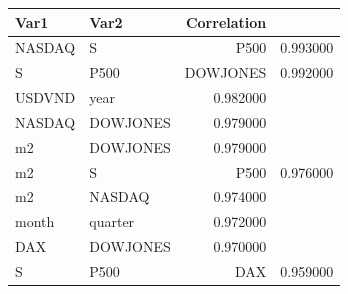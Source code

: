 \begin{tabular}{llr}
\toprule
Var1 & Var2 & Correlation \\
\midrule
NASDAQ & S&P500 & 0.993000 \\
S&P500 & DOWJONES & 0.992000 \\
USDVND & year & 0.982000 \\
NASDAQ & DOWJONES & 0.979000 \\
m2 & DOWJONES & 0.979000 \\
m2 & S&P500 & 0.976000 \\
m2 & NASDAQ & 0.974000 \\
month & quarter & 0.972000 \\
DAX & DOWJONES & 0.970000 \\
S&P500 & DAX & 0.959000 \\
\bottomrule
\end{tabular}
